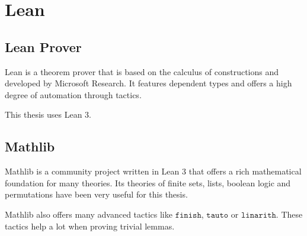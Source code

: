 \section{Lean}

\subsection{Lean Prover}

Lean is a theorem prover that is based on the calculus of constructions and developed by Microsoft Research.
It features dependent types and offers a high degree of automation through tactics.

This thesis uses Lean 3.

\subsection{Mathlib}

Mathlib is a community project written in Lean 3 that offers a rich mathematical foundation for many theories.
Its theories of finite sets, lists, boolean logic and permutations have been very useful for this thesis.

Mathlib also offers many advanced tactics like $\mathtt{finish}$, $\mathtt{tauto}$ or $\mathtt{linarith}$.
These tactics help a lot when proving trivial lemmas.
